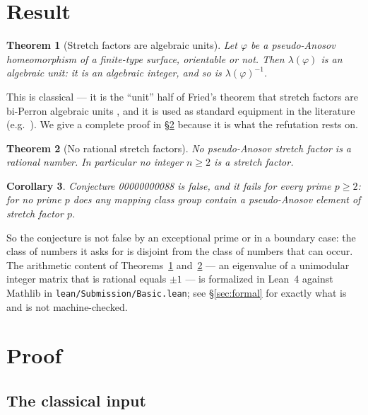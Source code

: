 \documentclass[11pt]{article}
\theoremstyle{plain}
\newtheorem{theorem}{Theorem}
\newtheorem{corollary}[theorem]{Corollary}
\theoremstyle{definition}
\theoremstyle{remark}
\newcommand{\conjid}{00000000088}
\begin{document}
\section{Result}

\begin{theorem}[Stretch factors are algebraic units]\label{thm:unit}
Let $\varphi$ be a pseudo-Anosov homeomorphism of a finite-type surface,
orientable or not. Then $\lambda(\varphi)$ is an algebraic unit: it is an
algebraic integer, and so is $\lambda(\varphi)^{-1}$.
\end{theorem}

This is classical --- it is the ``unit'' half of Fried's theorem that stretch
factors are bi-Perron algebraic units \cite{Fried}, and it is used as standard
equipment in the literature (e.g.\ \cite[\S5]{LeiningerReid}). We give a complete
proof in \S\ref{sec:proof} because it is what the refutation rests on.

\begin{theorem}[No rational stretch factors]\label{thm:irrational}
No pseudo-Anosov stretch factor is a rational number. In particular no integer
$n\ge2$ is a stretch factor.
\end{theorem}

\begin{corollary}\label{cor:main}
Conjecture \conjid{} is false, and it fails for \emph{every} prime $p\ge2$: for no
prime $p$ does any mapping class group contain a pseudo-Anosov element of stretch
factor $p$.
\end{corollary}

So the conjecture is not false by an exceptional prime or in a boundary case: the
class of numbers it asks for is disjoint from the class of numbers that can occur.
The arithmetic content of Theorems~\ref{thm:unit} and~\ref{thm:irrational} --- an
eigenvalue of a unimodular integer matrix that is rational equals $\pm1$ --- is
formalized in Lean~4 against Mathlib in \texttt{lean/Submission/Basic.lean}; see
\S\ref{sec:formal} for exactly what is and is not machine-checked.

\section{Proof}\label{sec:proof}

\subsection{The classical input}\label{sec:input}
\end{document}
